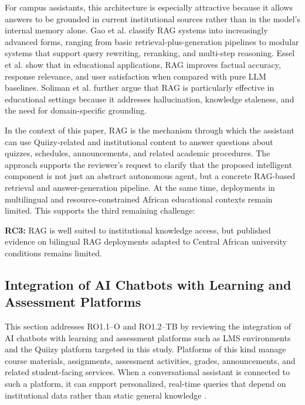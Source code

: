 \documentclass[a4paper,9pt,twocolumn]{extarticle}
\begin{document}
For campus assistants, this architecture is especially attractive because
it allows answers to be grounded in current institutional sources rather
than in the model's internal memory alone. Gao et al.
\cite{gao2023retrieval} classify RAG systems into increasingly advanced
forms, ranging from basic retrieval-plus-generation pipelines to modular
systems that support query rewriting, reranking, and multi-step
reasoning. Essel et al. \cite{essel2025rag} show that in educational
applications, RAG improves factual accuracy, response relevance, and
user satisfaction when compared with pure LLM baselines. Soliman et al.
\cite{soliman2025rag} further argue that RAG is particularly effective in
educational settings because it addresses hallucination, knowledge
staleness, and the need for domain-specific grounding.

In the context of this paper, RAG is the mechanism through which the
assistant can use Quiizy-related and institutional content to answer
questions about quizzes, schedules, announcements, and related academic
procedures. The approach supports the reviewer's request to clarify that
the proposed intelligent component is not just an abstract autonomous
agent, but a concrete RAG-based retrieval and answer-generation
pipeline. At the same time, deployments in multilingual and
resource-constrained African educational contexts remain limited. This
supports the third remaining challenge:

\textbf{RC3:} RAG is well suited to institutional knowledge access, but
published evidence on bilingual RAG deployments adapted to Central
African university conditions remains limited.

\subsection{Integration of AI Chatbots with Learning and Assessment Platforms}
\label{sec:soa:lms}

This section addresses RO1.1--O and RO1.2--TB by reviewing the
integration of AI chatbots with learning and assessment platforms such as
LMS environments and the Quiizy platform targeted in this study.
Platforms of this kind manage course materials, assignments, assessment
activities, grades, announcements, and related student-facing services.
When a conversational assistant is connected to such a platform, it can
support personalized, real-time queries that depend on institutional
data rather than static general knowledge \cite{alsaqqa2025,neumann2025,
kim2025}.
\end{document}
